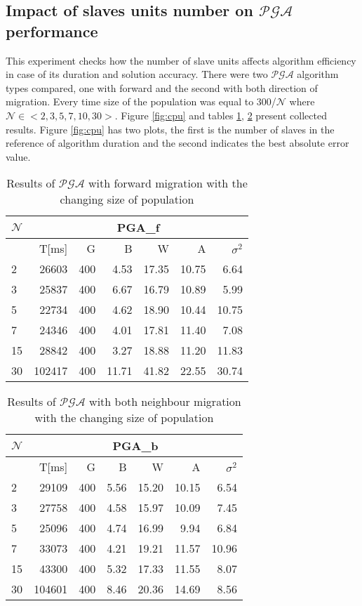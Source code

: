 \subsection{Impact of slaves units number on $\mathcal{PGA}$ performance}
\label{cha:cpu}
This experiment checks how the number of slave units affects algorithm
efficiency in case of its duration and solution accuracy. There were two $\mathcal{PGA}$
algorithm types compared, one with forward and the second with both direction of
migration. Every time size of the
population was equal to 300/$\mathcal{N}$ where $\mathcal{N} \in <2, 3, 5, 7, 10,
30>$. Figure \ref{fig:cpu} and tables \ref{pga1cpu}, \ref{pga2cpu} present
collected results. Figure \ref{fig:cpu} has two plots, the first is the number of slaves in the reference of algorithm
duration and the second indicates the best absolute error value. 
\nopagebreak
\begin{table}[!htpb]
	\label{pga1cpu}
	\caption{Results of $\mathcal{PGA}$ with forward migration with the changing
	size of population}
	\centering
	\begin{tabular}{l||r|r|r|r|r|r|}
        $\mathcal{N}$ & \multicolumn{6}{c|}{PGA\_f} \\ \hline
		          &T[ms]&G& B&W&A&$\sigma^2$ \\ \hline
		2&26603&400&4.53&17.35&10.75&6.64\\ \hline
		3&25837&400&6.67&16.79&10.89&5.99\\ \hline
		5&22734&400&4.62&18.90&10.44&10.75\\ \hline
		7&24346&400&4.01&17.81&11.40&7.08\\ \hline
		15&28842&400&3.27&18.88&11.20&11.83\\ \hline
		30&102417&400&11.71&41.82&22.55&30.74\\ \hline
	\end{tabular}
\end{table}
\begin{table}[!htpb]
	\label{pga2cpu}
	\caption{Results of $\mathcal{PGA}$ with both neighbour migration with the changing
	size of population}
	\centering
	\begin{tabular}{l||r|r|r|r|r|r|}
        $\mathcal{N}$ & \multicolumn{6}{c|}{PGA\_b} \\ \hline
		          &T[ms]&G& B&W&A&$\sigma^2$ \\ \hline
	2&29109&400&5.56&15.20&10.15&6.54\\ \hline
	3&27758&400&4.58&15.97&10.09&7.45\\ \hline
	5&25096&400&4.74&16.99&9.94&6.84\\ \hline
	7&33073&400&4.21&19.21&11.57&10.96\\ \hline
	15&43300&400&5.32&17.33&11.55&8.07\\ \hline
	30&104601&400&8.46&20.36&14.69&8.56\\ \hline
	\end{tabular}
\end{table}
